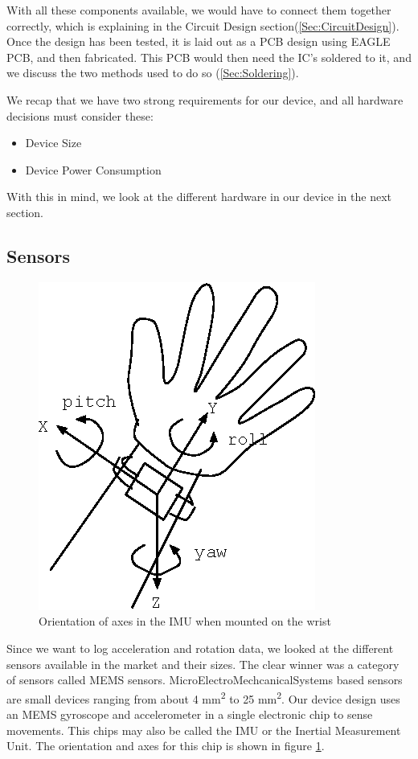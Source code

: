 With all these components available, we would have to connect them together correctly, which is explaining in the Circuit Design section(\ref{Sec:CircuitDesign}). Once the design has been tested, it is laid out as a PCB design using EAGLE PCB, and then fabricated. This PCB would then need the IC's soldered to it, and we discuss the two methods used to do so (\ref{Sec:Soldering}).

We recap that we have two strong requirements for our device, and all hardware decisions must consider these:
\begin{itemize}
  \item Device Size
  \item Device Power Consumption
\end{itemize}
With this in mind, we look at the different hardware in our device in the next section.

\subsection{Sensors}
\begin{figure}
\begin{center}
\includegraphics{images/HandAxis.eps}
\caption{Orientation of axes in the IMU when mounted on the wrist}
\label{fig:AccAxis}
\end{center}
\end{figure}
Since we want to log acceleration and rotation data, we looked at the different sensors available in the market and their sizes. The clear winner was a category of sensors called MEMS sensors. MicroElectroMechcanicalSystems based sensors are small devices ranging from about 4 mm\textsuperscript{2} to  25 mm\textsuperscript{2}. Our device design uses an MEMS gyroscope and accelerometer in a single electronic chip to sense movements. This chips may also be called the IMU or the Inertial Measurement Unit. The orientation and axes for this chip is shown in figure \ref{fig:AccAxis}.

